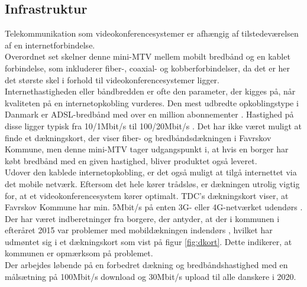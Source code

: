 \subsection{Infrastruktur}
Telekommunikation som videokonferencesystemer er afhængig af tilstedeværelsen af en  internetforbindelse.\\
Overordnet set skelner denne mini-MTV mellem mobilt bredbånd og en kablet forbindelse, som inkluderer fiber-, coaxial- og kobberforbindelser, da det er her det største skel i forhold til videokonferencesystemer ligger.\\
Internethastigheden eller båndbredden er ofte den parameter, der kigges på, når kvaliteten på en internetopkobling vurderes. Den mest udbredte opkoblingstype i Danmark er ADSL-bredbånd med over en million abonnementer \cite{statadsl}. Hastighed på disse ligger typisk fra 10/1Mbit/s til 100/20Mbit/s \cite{tdchastigheder} \cite{telenorhastigheder}. Det har ikke været muligt at finde et dækningskort, der viser fiber- og bredbåndsdækningen i Favrskov Kommune, men denne mini-MTV tager udgangspunkt i, at hvis en borger har købt bredbånd med en given hastighed, bliver produktet også leveret.\\
Udover den kablede internetopkobling, er det også muligt at tilgå internettet via det mobile netværk. Eftersom det hele kører trådsløs, er dækningen utrolig vigtig for, at et videokonferencesystem kører optimalt. TDC's dækningskort viser, at Favrskov Kommune har min. 5Mbit/s på enten 3G- eller 4G-netværket udendørs \cite{tdcdaekning}.
Der har været indberetninger fra borgere, der antyder, at der i kommunen i efteråret 2015 var problemer med mobildækningen indendørs \cite{tv2oj_daekning}, hvilket har udmøntet sig i et dækningskort som vist på figur \ref{fig:dkort}. Dette indikerer, at kommunen er opmærksom på problemet.\\
Der arbejdes løbende på en forbedret dækning og bredbåndshastighed med en målsætning på 100Mbit/s download og 30Mbit/s upload til alle danskere i 2020\cite{digitalvel}.

